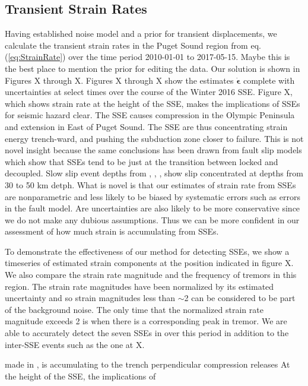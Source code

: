 \documentclass[10pt,a4paper]{article}
\begin{document}
\subsection{Transient Strain Rates} 
 
Having established noise model and a prior for transient displacements, we calculate the transient strain rates in the Puget Sound region from eq. (\ref{eq:StrainRate}) over the time period 2010-01-01 to 2017-05-15. Maybe this is the best place to mention the prior for editing the data. Our solution is shown in Figures X through X. Figures X through X show the estimates $\dot{\bm{\epsilon}}$ complete with uncertainties at select times over the course of the Winter 2016 SSE. Figure X, which shows strain rate at the height of the SSE, makes the implications of SSEs for seismic hazard clear.  The SSE causes compression in the Olympic Peninsula and extension in East of Puget Sound. The SSE are thus concentrating strain energy trench-ward, and pushing the subduction zone closer to failure. This is not novel insight because the same conclusions has been drawn from fault slip models which show that SSEs tend to be just at the transition between locked and decoupled. Slow slip event depths from \citet{Dragert2001}, \citet{Wech2009}, \citet{Schmidt2010}, \citet{Bartlow2011} show slip concentrated at depths from 30 to 50 km detph. What is novel is that our estimates of strain rate from SSEs are nonparametric and less likely to be biased by systematic errors such as errors in the fault model. Are uncertainties are also likely to be more conservative since we do not make any dubious assumptions. Thus we can be more confident in our assessment of how much strain is accumulating from SSEs.

To demonstrate the effectiveness of our method for detecting SSEs, we show a timeseries of estimated strain components at the position indicated in figure X.  We also compare the strain rate magnitude and the frequency of tremors in this region.  The strain rate magnitudes have been normalized by its estimated uncertainty and so strain magnitudes less than ${\sim}$2 can be considered to be part of the background noise. The only time that the normalized strain rate magnitude exceeds 2 is when there is a corresponding peak in tremor.  We are able to accurately detect the seven SSEs in over this period in addition to the inter-SSE events such as the one at X.      

made in ,  is accumulating to the trench perpendicular compression releases At the height of the SSE, the implications of    
  
\end{document}
